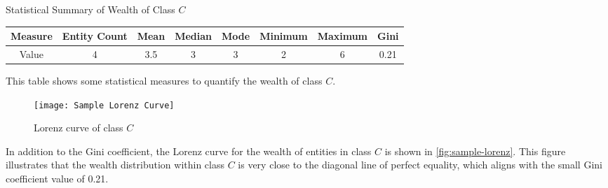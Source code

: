 \begin{center}
    \scriptsize
    \begin{threeparttable}
    \captionsetup{font=small}
    \caption{Statistical Summary of Wealth of Class \(C\)}
    \label{tab:sample statistical summary}
    \begin{tabular}{c | c c c c c c c} 
    
    \toprule
        Measure & Entity Count & Mean & Median & Mode & Minimum & Maximum & Gini \\ [0.5ex] 
    \midrule
        Value & 4 & 3.5 & 3 & 3 & 2 & 6 & 0.21 \\
        [0.5ex]
    \bottomrule
    \end{tabular}
    \begin{tablenotes}
        \scriptsize
        \item{This table shows some statistical measures to quantify the wealth of class \(C\).}
    \end{tablenotes}
    \end{threeparttable}
\end{center}

\begin{figure}[!htbp]
    \centering
    \texttt{[image: Sample Lorenz Curve]}
    \caption{Lorenz curve of class \(C\)} \label{fig:sample-lorenz}
\end{figure}

In addition to the Gini coefficient, the Lorenz curve for the wealth of entities in class \(C\) is shown in \autoref{fig:sample-lorenz}. This figure illustrates that the wealth distribution within class \(C\) is very close to the diagonal line of perfect equality, which aligns with the small Gini coefficient value of 0.21.